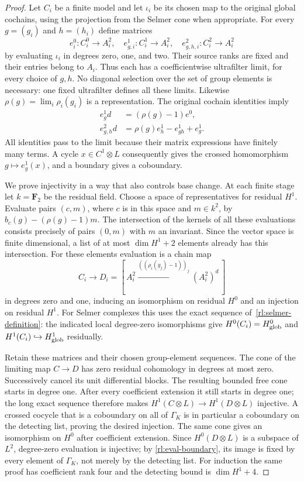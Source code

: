 \begin{proof}
Let $C_i$ be a finite model and let $\iota_i$ be its chosen map to the
original global cochains, using the projection from the Selmer cone
when appropriate.  For every $g=(g_i)$ and $h=(h_i)$ define matrices
\[
 e^0_i:C_i^0\to A_i^2,\quad
 e^1_{g,i}:C_i^1\to A_i^2,\quad
 e^2_{g,h,i}:C_i^2\to A_i^2
\]
by evaluating $\iota_i$ in degrees zero, one, and two.  Their source
ranks are fixed and their entries belong to $A_i$.  Thus each has a
coefficientwise ultrafilter limit, for every choice of $g,h$.
No diagonal selection over the set of group elements is necessary:
one fixed ultrafilter defines all these limits.  Likewise
$\rho(g)=\lim_i\rho_i(g_i)$ is a representation.  The original
cochain identities imply
\begin{align}
 e^1_g d&=(\rho(g)-1)e^0,\label{rl:eval-boundary}\\
 e^2_{g,h}d&=\rho(g)e^1_h-e^1_{gh}+e^1_g.
                         \label{rl:eval-cocycle}
\end{align}
All identities pass to the limit because their matrix expressions
have finitely many terms.  A cycle $x\in C^1\otimes L$ consequently
gives the crossed homomorphism $g\mapsto e^1_g(x)$, and a boundary
gives a coboundary.

We prove injectivity in a way that also controls base change.  At each
finite stage let $k=\mathbf F_2$ be the residual field.  Choose a
space of representatives for residual $H^1$.  Evaluate pairs $(c,m)$,
where $c$ is in this space and $m\in k^2$, by
$b_c(g)-(\rho(g)-1)m$.  The intersection of the kernels of all
these evaluations consists precisely of pairs $(0,m)$ with $m$ an
invariant.  Since the vector space is finite dimensional, a list of
at most $\dim H^1+2$ elements already has this intersection.  For
these elements evaluation is a chain map
\[
 C_i\longrightarrow D_i=
 [\,A_i^2\xrightarrow{((\rho_i(g_j)-1))_j}(A_i^2)^d\,]
\]
in degrees zero and one, inducing an isomorphism on residual $H^0$
and an injection on residual $H^1$.  For Selmer complexes this uses
the exact sequence of~\eqref{rl:selmer-definition}: the indicated
local degree-zero isomorphisms give $H^0(C_i)=H^0_{\rm glob}$ and
$H^1(C_i)\hookrightarrow H^1_{\rm glob}$ residually.

Retain these matrices and their chosen group-element sequences.  The
cone of the limiting map $C\to D$ has zero residual cohomology in
degrees at most zero.  Successively cancel its unit differential
blocks.  The resulting bounded free cone starts in degree one.
After every coefficient extension it still starts in degree one;
the long exact sequence therefore makes $H^1(C\otimes L)\to
H^1(D\otimes L)$ injective.  A crossed cocycle that is a coboundary
on all of $\Gamma_K$ is in particular a coboundary on the detecting
list, proving the desired injection.  The same cone gives an
isomorphism on $H^0$ after coefficient extension.  Since $H^0(D\otimes L)$
is a subspace of $L^2$, degree-zero evaluation is injective; by
\eqref{rl:eval-boundary}, its image is fixed by every element of
$\Gamma_K$, not merely by the detecting list.  For induction the same proof
has coefficient rank four and the detecting bound is $\dim H^1+4$.
\end{proof}

